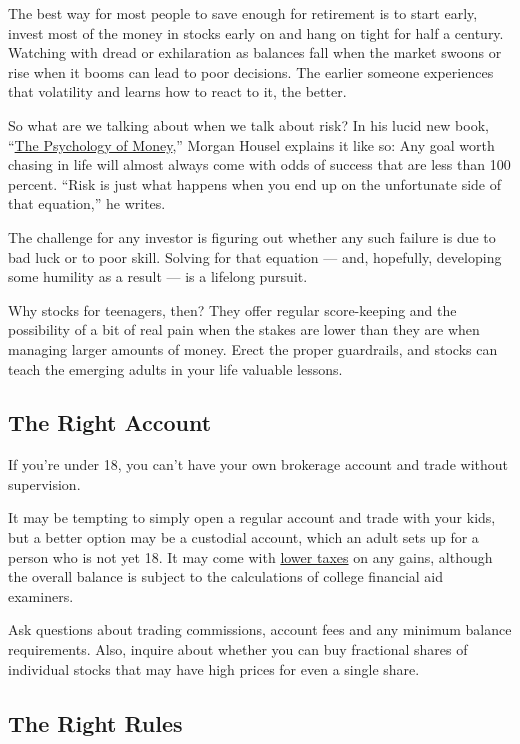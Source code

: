 The best way for most people to save enough for retirement is to start
early, invest most of the money in stocks early on and hang on tight for
half a century. Watching with dread or exhilaration as balances fall
when the market swoons or rise when it booms can lead to poor decisions.
The earlier someone experiences that volatility and learns how to react
to it, the better.

So what are we talking about when we talk about risk? In his lucid new
book,
``\href{https://www.collaborativefund.com/blog/book-the-psychology-of-money/}{The
Psychology of Money},'' Morgan Housel explains it like so: Any goal
worth chasing in life will almost always come with odds of success that
are less than 100 percent. ``Risk is just what happens when you end up
on the unfortunate side of that equation,'' he writes.

The challenge for any investor is figuring out whether any such failure
is due to bad luck or to poor skill. Solving for that equation --- and,
hopefully, developing some humility as a result --- is a lifelong
pursuit.

Why stocks for teenagers, then? They offer regular score-keeping and the
possibility of a bit of real pain when the stakes are lower than they
are when managing larger amounts of money. Erect the proper guardrails,
and stocks can teach the emerging adults in your life valuable lessons.

\hypertarget{the-right-account}{%
\subsection{The Right Account}\label{the-right-account}}

If you're under 18, you can't have your own brokerage account and trade
without supervision.

It may be tempting to simply open a regular account and trade with your
kids, but a better option may be a custodial account, which an adult
sets up for a person who is not yet 18. It may come with
\href{https://www.irs.gov/taxtopics/tc553}{lower taxes} on any gains,
although the overall balance is subject to the calculations of college
financial aid examiners.

Ask questions about trading commissions, account fees and any minimum
balance requirements. Also, inquire about whether you can buy fractional
shares of individual stocks that may have high prices for even a single
share.

\hypertarget{the-right-rules}{%
\subsection{The Right Rules}\label{the-right-rules}}

